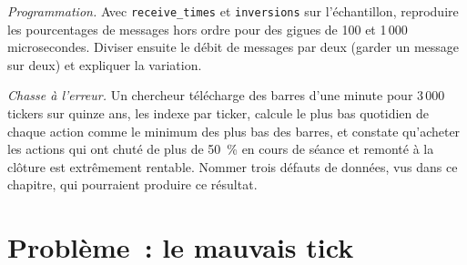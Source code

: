 \begin{exercise}[$\star\star\star$]\label{exo:m1:reading-market-data:7}
\emph{Programmation.} Avec \texttt{receive\_times} et \texttt{inversions} sur l'échantillon,
reproduire les pourcentages de messages hors ordre pour des gigues de 100 et 1\,000
microsecondes. Diviser ensuite le débit de messages par deux (garder un message sur deux) et
expliquer la variation.
\end{exercise}

\begin{exercise}[$\star\star\star$]\label{exo:m1:reading-market-data:8}
\emph{Chasse à l'erreur.} Un chercheur télécharge des barres d'une minute pour 3\,000
tickers sur quinze ans, les indexe par ticker, calcule le plus bas quotidien de chaque action
comme le minimum des plus bas des barres, et constate qu'acheter les actions qui ont chuté de
plus de 50~\% en cours de séance et remonté à la clôture est extrêmement rentable. Nommer
trois défauts de données, vus dans ce chapitre, qui pourraient produire ce résultat.
\end{exercise}

\section{Problème~: le mauvais tick}

